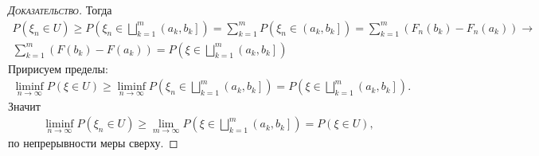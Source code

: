 \documentclass[../main.tex]{subfiles}
\begin{document}
\begin{proof}[\normalfont\textsc{Доказательство}]
 Тогда
 \begin{align*}
  P(\xi_n \in U) \geqslant P(\xi_n \in \bigsqcup_{k=1}^{m} \left(a_k, b_k\right]  ) = \sum_{k=1}^{m}P(\xi_n \in \left(a_k, b_k\right]  ) = \sum_{k=1}^{m}(F_n(b_k) - F_n(a_k)) \to \\
  \sum_{k=1}^{m}(F(b_k)-F(a_k)) = P(\xi \in \bigsqcup_{k=1}^{m}\left(a_k, b_k\right]  )
 \end{align*} Пририсуем пределы:
 \begin{align*}
  \liminf_{n \to \infty} P(\xi \in U) \geqslant \liminf_{n \to \infty} P(\xi_n \in \bigsqcup_{k=1}^{m}\left(a_k, b_k\right]  ) = P(\xi \in \bigsqcup_{k=1}^{m}\left(a_k, b_k\right]  ).
 \end{align*} Значит
 \begin{align*}
  \liminf_{n \to \infty} P(\xi_n \in U) \geqslant \lim_{m \to \infty} P(\xi \in \bigsqcup_{k=1}^{m} \left(a_k, b_k\right]  ) = P(\xi \in U),
 \end{align*} по непрерывности меры сверху.


\end{proof}
\end{document}
